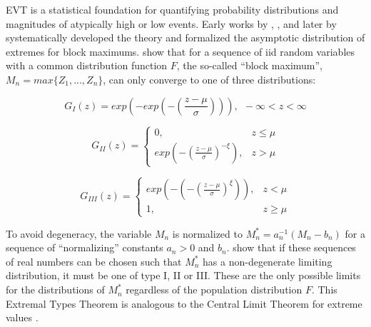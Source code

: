 \Acrfull{EVT} is a statistical foundation for quantifying probability distributions and magnitudes of atypically high or low events. Early works by \cite{frechet1927loi}, \cite{fisher1928limiting}, \cite{mises1936distribution} and later by \cite{gnedenko1943distribution}  systematically developed the theory and formalized the asymptotic distribution of extremes for block maximums. \cite{fisher1928limiting} show that for a sequence of \gls{iid} random variables with a common distribution function $F$, the so-called ``block maximum'', $M_n = max\{Z_1,...,Z_n\}$, can only converge to one of three distributions:

\begin{equation}
    G_{I}(z) = exp\left(-exp\left(-\left(\frac{z-\mu}{\sigma}\right)\right)\right), \ \ -\infty < z < \infty
    \label{eq:1}
\end{equation}

\begin{equation}
    G_{II}(z) =
    \begin{cases}
        0,                                                           & z \leq \mu \\
        exp\left(-\left( \frac{z-\mu}{\sigma} \right)^{-\xi}\right), & z > \mu
    \end{cases}
    \label{eq:2}
\end{equation}

\begin{equation}
    G_{III}(z) =
    \begin{cases}
        exp\left(-\left( -\left(\frac{z-\mu}{\sigma} \right)^{\xi} \right) \right), & z < \mu    \\
        1,                                                                          & z \geq \mu
    \end{cases}
    \label{eq:3}
\end{equation}

To avoid degeneracy, the variable $M_n$ is normalized to $M_n^* = a_n^{-1}(M_n - b_n)$ for a sequence of ``normalizing'' constants $a_n > 0$ and $b_n$. \cite{fisher1928limiting} show that if these sequences of real numbers can be chosen such that $M_n^*$ has a non-degenerate limiting distribution, it must be one of type I, II or III. These are the only possible limits for the distributions of $M_n^*$ regardless of the population distribution $F$. This Extremal Types Theorem is analogous to the Central Limit Theorem for extreme values \citep{coles2001introduction}.

